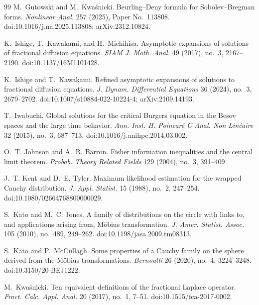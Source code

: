 \documentclass[11pt,reqno]{amsart}
\theoremstyle{plain}
\theoremstyle{definition}
\numberwithin{equation}{section}
\begin{document}
\begin{thebibliography}{99}
M.~Gutowski and M.~Kwa{\'s}nicki.
\newblock Beurling--Deny formula for Sobolev--Bregman forms.
\newblock \emph{Nonlinear Anal.} 257 (2025), Paper No.~113808.
\newblock doi:10.1016/j.na.2025.113808; arXiv:2312.10824.

K.~Ishige, T.~Kawakami, and H.~Michihisa.
\newblock Asymptotic expansions of solutions of fractional diffusion
equations.
\newblock \emph{SIAM J. Math. Anal.} 49 (2017), no.~3, 2167--2190.
\newblock doi:10.1137/16M1101428.

K.~Ishige and T.~Kawakami.
\newblock Refined asymptotic expansions of solutions to fractional diffusion
equations.
\newblock \emph{J. Dynam. Differential Equations} 36 (2024), no.~3,
2679--2702.
\newblock doi:10.1007/s10884-022-10224-4; arXiv:2109.14193.

T.~Iwabuchi.
\newblock Global solutions for the critical Burgers equation in the Besov
spaces and the large time behavior.
\newblock \emph{Ann. Inst. H. Poincar{\'e} C Anal. Non Lin{\'e}aire}
32 (2015), no.~3, 687--713.
\newblock doi:10.1016/j.anihpc.2014.03.002.

O.~T. Johnson and A.~R. Barron.
\newblock Fisher information inequalities and the central limit theorem.
\newblock \emph{Probab. Theory Related Fields} 129 (2004), no.~3, 391--409.

J.~T. Kent and D.~E. Tyler.
\newblock Maximum likelihood estimation for the wrapped Cauchy distribution.
\newblock \emph{J. Appl. Statist.} 15 (1988), no.~2, 247--254.
\newblock doi:10.1080/02664768800000029.

S.~Kato and M.~C. Jones.
\newblock A family of distributions on the circle with links to, and
applications arising from, M{\"o}bius transformation.
\newblock \emph{J. Amer. Statist. Assoc.} 105 (2010), no.~489, 249--262.
\newblock doi:10.1198/jasa.2009.tm08313.

S.~Kato and P.~McCullagh.
\newblock Some properties of a Cauchy family on the sphere derived from the
M{\"o}bius transformations.
\newblock \emph{Bernoulli} 26 (2020), no.~4, 3224--3248.
\newblock doi:10.3150/20-BEJ1222.

M.~Kwa{\'s}nicki.
\newblock Ten equivalent definitions of the fractional Laplace operator.
\newblock \emph{Fract. Calc. Appl. Anal.} 20 (2017), no.~1, 7--51.
\newblock doi:10.1515/fca-2017-0002.


\end{thebibliography}
\end{document}
